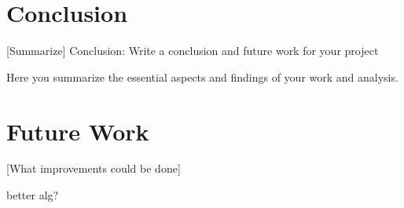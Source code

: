 %

\section{Conclusion}
[Summarize]
Conclusion: Write a conclusion and future work for your project

Here you summarize the essential aspects and findings 
of your work and analysis.


\section{Future Work}
[What improvements could be done]

better alg? 
